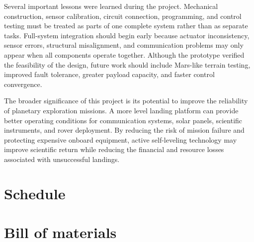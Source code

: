 \documentclass{engr1000j-s2}
\begin{document}
Several important lessons were learned during the project. Mechanical construction, sensor calibration, circuit connection, programming, and control testing must be treated as parts of one complete system rather than as separate tasks. Full-system integration should begin early because actuator inconsistency, sensor errors, structural misalignment, and communication problems may only appear when all components operate together. Although the prototype verified the feasibility of the design, future work should include Mars-like terrain testing, improved fault tolerance, greater payload capacity, and faster control convergence.

The broader significance of this project is its potential to improve the reliability of planetary exploration missions. A more level landing platform can provide better operating conditions for communication systems, solar panels, scientific instruments, and rover deployment. By reducing the risk of mission failure and protecting expensive onboard equipment, active self-leveling technology may improve scientific return while reducing the financial and resource losses associated with unsuccessful landings.




\newpage

\section{Schedule}






\newpage

\section{Bill of materials}

\end{document}
